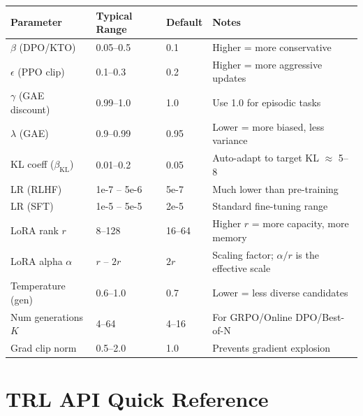 \begin{tabular}{@{}lp{3.5cm}p{3.5cm}p{6cm}@{}}
\toprule
\textbf{Parameter} & \textbf{Typical Range} & \textbf{Default} & \textbf{Notes} \\
\midrule
$\beta$ (DPO/KTO) & 0.05--0.5 & 0.1 & Higher = more conservative \\
$\epsilon$ (PPO clip) & 0.1--0.3 & 0.2 & Higher = more aggressive updates \\
$\gamma$ (GAE discount) & 0.99--1.0 & 1.0 & Use 1.0 for episodic tasks \\
$\lambda$ (GAE) & 0.9--0.99 & 0.95 & Lower = more biased, less variance \\
KL coeff ($\beta_\text{KL}$) & 0.01--0.2 & 0.05 & Auto-adapt to target KL $\approx$ 5--8 \\
LR (RLHF) & 1e-7 -- 5e-6 & 5e-7 & Much lower than pre-training \\
LR (SFT) & 1e-5 -- 5e-5 & 2e-5 & Standard fine-tuning range \\
LoRA rank $r$ & 8--128 & 16--64 & Higher $r$ = more capacity, more memory \\
LoRA alpha $\alpha$ & $r$ -- $2r$ & $2r$ & Scaling factor; $\alpha/r$ is the effective scale \\
Temperature (gen) & 0.6--1.0 & 0.7 & Lower = less diverse candidates \\
Num generations $K$ & 4--64 & 4--16 & For GRPO/Online DPO/Best-of-N \\
Grad clip norm & 0.5--2.0 & 1.0 & Prevents gradient explosion \\
\bottomrule
\end{tabular}

\section{TRL API Quick Reference}
\label{trl-api-quick-reference}

